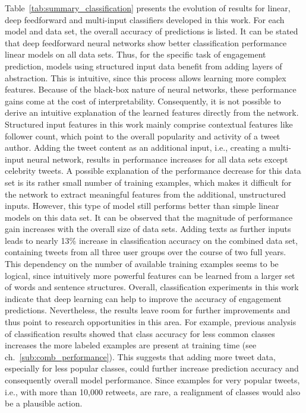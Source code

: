 Table~\ref{tab:summary_classification} presents the evolution of results for linear,
deep feedforward and multi-input classifiers developed in this work.
For each model and data set, the overall accuracy of predictions is listed.
It can be stated that deep feedforward neural networks show better classification
performance linear models on all data sets.
Thus, for the specific task of engagement prediction, models using structured
input data benefit from adding layers of abstraction.
This is intuitive, since this process allows learning more complex features.
Because of the black-box nature of neural networks, these performance gains
come at the cost of interpretability.
Consequently, it is not possible to derive an intuitive explanation of the learned
features directly from the network.
Structured input features in this work mainly comprise contextual features like
follower count, which point to the overall popularity and activity of a tweet
author.
Adding the tweet content as an additional input, i.e., creating a multi-input
neural network, results in performance increases for all data sets except
celebrity tweets.
A possible explanation of the performance decrease for this data set is its rather small number of
training examples, which makes it difficult for the network to extract meaningful
features from the additional, unstructured inputs.
However, this type of model still performs better than simple linear models
on this data set.
It can be observed that the magnitude of performance gain increases with the
overall size of data sets.
Adding texts as further inputs leads to nearly 13\% increase in classification
accuracy on the combined data set, containing tweets from all three user groups
over the course of two full years.
This dependency on the number of available training examples seems to be logical,
since intuitively more powerful features can be learned from a larger set of words and
sentence structures.
Overall, classification experiments in this work indicate that
deep learning can help to improve the accuracy of engagement predictions.
Nevertheless, the results leave room for further improvements and thus point
to research opportunities in this area.
For example, previous analysis of classification results showed that class accuracy for less
common classes increases the more labeled examples are present at training time (see ch.~\ref{sub:comb_performance}).
This suggests that adding more tweet data, especially for less popular classes,
could further increase prediction accuracy and consequently overall model performance.
Since examples for very popular tweets, i.e., with more than 10,000 retweets, are
rare, a realignment of classes would also be a plausible action.

